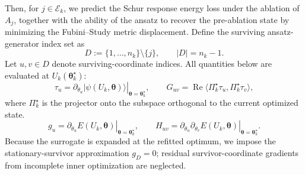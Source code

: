 \documentclass[
  reprint,
  amsmath,
  amssymb,
  aps,
  pra,
  nofootinbib,
  superscriptaddress,
  floatfix
]{revtex4-2}
\newcommand{\ket}[1]{|#1\rangle}
\begin{document}
Then, for \(j\in\mathcal E_k\), we predict the Schur response energy
loss under the ablation of \(A_j\), together with the ability of the ansatz to
recover the pre-ablation state by minimizing the Fubini--Study metric
displacement. Define the surviving ansatz-generator index set as
\[
D:=\{1,\ldots,n_k\}\setminus\{j\},
\qquad
|D|=n_k-1 .
\]
Let \(u,v\in D\) denote surviving-coordinate indices. All quantities below are
evaluated at \(U_k(\boldsymbol\theta_k^\star)\):
\[
\tau_u
=
\left.
\partial_{\theta_u}\ket{\psi(U_k,\boldsymbol\theta)}
\right|_{\boldsymbol\theta=\boldsymbol\theta_k^\star},
\qquad
G_{uv}
=
\operatorname{Re}\langle \Pi_k^\star\tau_u,\Pi_k^\star\tau_v\rangle,
\]
where \(\Pi_k^\star\) is the projector onto the subspace orthogonal to the current optimized state.
\[
g_u
=
\left.
\partial_{\theta_u}E(U_k,\boldsymbol\theta)
\right|_{\boldsymbol\theta=\boldsymbol\theta_k^\star},
\qquad
H_{uv}
=
\left.
\partial_{\theta_u}\partial_{\theta_v}E(U_k,\boldsymbol\theta)
\right|_{\boldsymbol\theta=\boldsymbol\theta_k^\star}.
\]
Because the surrogate is expanded at the refitted optimum, we impose the
stationary-survivor approximation \(g_D=0\); residual survivor-coordinate
gradients from incomplete inner optimization are neglected.
\end{document}
